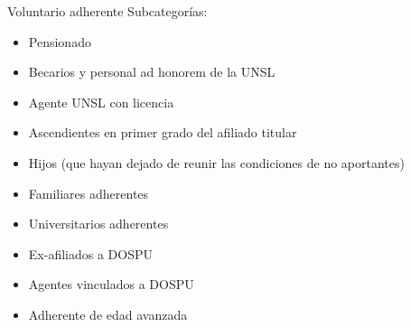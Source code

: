 \documentclass[10pt]{beamer}
\begin{document}
\begin{frame}{Voluntario adherente}
    Subcategorías:
    \begin{itemize}
        \item Pensionado
        \item Becarios y personal ad honorem de la UNSL
        \item Agente UNSL con licencia
        \item Ascendientes en primer grado del afiliado titular
        \item Hijos (que hayan dejado de reunir las condiciones de no aportantes)
        \item Familiares adherentes
        \item Universitarios adherentes
        \item Ex-afiliados a DOSPU
        \item Agentes vinculados a DOSPU
        \item Adherente de edad avanzada
    \end{itemize}
\end{frame}

\end{document}
